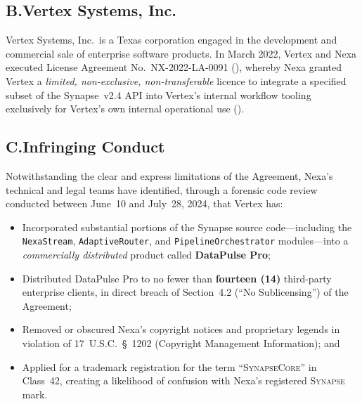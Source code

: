 \subsection*{B.\quad Vertex Systems, Inc.}

Vertex Systems, Inc.\ is a Texas corporation engaged in the development and
commercial sale of enterprise software products. In March 2022, Vertex and
Nexa executed License Agreement No.~NX-2022-LA-0091 (),
whereby Nexa granted Vertex a \textit{limited, non-exclusive, non-transferable}
licence to integrate a specified subset of the Synapse~v2.4 API into Vertex's
internal workflow tooling exclusively for Vertex's own internal operational use
().

\subsection*{C.\quad Infringing Conduct}

Notwithstanding the clear and express limitations of the Agreement, Nexa's
technical and legal teams have identified, through a forensic code review
conducted between June~10 and July~28, 2024, that Vertex has:

\begin{itemize}[leftmargin=2em, itemsep=4pt]
  \item Incorporated substantial portions of the Synapse source code—including
        the \texttt{NexaStream}, \texttt{AdaptiveRouter}, and
        \texttt{PipelineOrchestrator} modules—into a \textit{commercially
        distributed} product called \textbf{DataPulse Pro};

  \item Distributed DataPulse Pro to no fewer than \textbf{fourteen (14)}
        third-party enterprise clients, in direct breach of Section~4.2
        (``No Sublicensing'') of the Agreement;

  \item Removed or obscured Nexa's copyright notices and proprietary legends
        in violation of 17~U.S.C.~\S~1202 (Copyright Management Information);
        and

  \item Applied for a trademark registration for the term ``\textsc{SynapseCore}''
        in Class~42, creating a likelihood of confusion with Nexa's
        registered \textsc{Synapse} mark.
\end{itemize}
